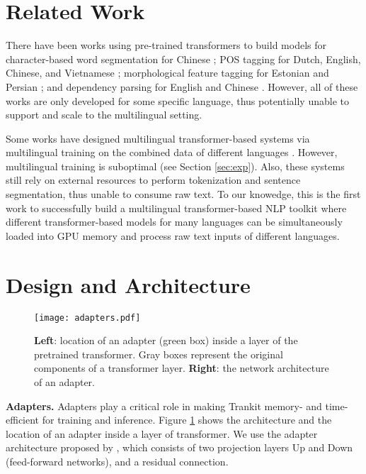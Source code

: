 \documentclass[11pt,a4paper]{article}
\begin{document}
\section{Related Work}
There have been works using pre-trained transformers to build models for character-based word segmentation for Chinese \citep{yang2019bert,tian-etal-2020-joint-chinese,che2020n}; POS tagging for Dutch, English, Chinese, and Vietnamese \citep{de2019bertje,tenney-etal-2019-bert,tian-etal-2020-joint-chinese,che2020n,nguyen-tuan-nguyen-2020-phobert}; morphological feature tagging for Estonian and Persian \citep{kittask2020evaluating,mohseni-tebbifakhr-2019-morphobert}; and dependency parsing for English and Chinese \citep{tenney-etal-2019-bert,che2020n}. However, all of these works are only developed for some specific language, thus potentially unable to support and scale to the multilingual setting.

Some works have designed multilingual transformer-based systems via multilingual training on the combined data of different languages \citep{tsai-etal-2019-small,kondratyuk-straka-2019-75,ustun-etal-2020-udapter}. However, multilingual training is suboptimal (see Section \ref{sec:exp}). Also, these systems still rely on external resources to perform tokenization and sentence segmentation, thus unable to consume raw text. To our knowedge, this is the first work to successfully build a multilingual transformer-based NLP toolkit where different transformer-based models for many languages can be simultaneously loaded into GPU memory and process raw text inputs of different languages.

\section{Design and Architecture}




\begin{figure}[ht]
    \centering
\texttt{[image: adapters.pdf]}
    \caption{\textbf{Left}: location of an adapter (green box) inside a layer of the pretrained transformer.  Gray boxes represent the original components of a transformer layer. \textbf{Right}: the network architecture of an adapter.}
    \label{fig:adapters}
\end{figure}

\noindent \textbf{Adapters.} Adapters play a critical role in making Trankit memory- and time-efficient for training and inference. Figure \ref{fig:adapters} shows the architecture and the location of an adapter inside a layer of transformer. We use the adapter architecture proposed by \citep{pfeiffer-etal-2020-adapterhub,pfeiffer-etal-2020-mad}, which consists of two projection layers \textrm{Up} and \textrm{Down} (feed-forward networks), and a residual connection.
\end{document}
